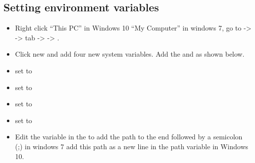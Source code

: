\documentclass[letterpaper,10pt,english]{sphinxmanual}
\begin{document}
\subsection{Setting environment variables}
\label{\detokenize{installation:setting-environment-variables}}
\begin{DUlineblock}{0em}
\item[] 
\end{DUlineblock}
\begin{itemize}
\item {} 
Right click “This PC” in Windows 10  “My Computer” in windows 7, go to  -\textgreater{}  -\textgreater{}  tab -\textgreater{}  -\textgreater{} .

\item {} 
Click new and add four new system variables. Add the  and  as shown below.

\end{itemize}
\begin{itemize}
\item {} 
 set to 

\item {} 
 set to 

\item {} 
 set to 

\item {} 
 set to 

\end{itemize}
\begin{itemize}
\item {} 
Edit the variable  in the  to add the path  to the end followed by a semicolon (;) in windows 7  add this path as a new line in the path variable in Windows 10.

\end{itemize}
\end{document}
